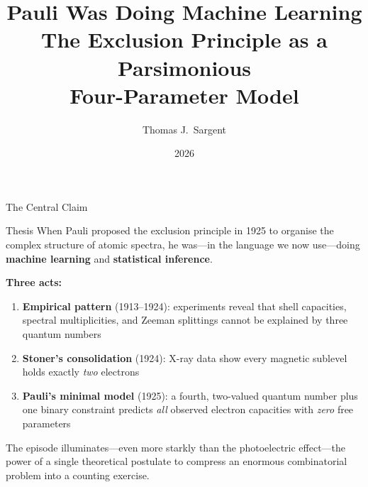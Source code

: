 \documentclass[aspectratio=169,12pt]{beamer}
\title[Pauli Was Doing Machine Learning]{%
  \textbf{Pauli Was Doing Machine Learning}\\[4pt]
  {\normalsize The Exclusion Principle as a Parsimonious\\
   Four-Parameter Model}}
\author{Thomas J.\ Sargent}
\institute{New York University \& Hoover Institution}
\date{2026}
\begin{document}

\begin{frame}[plain]
  \titlepage
\end{frame}

\begin{frame}{The Central Claim}

\begin{block}{Thesis}
When Pauli proposed the exclusion principle in 1925 to organise the
complex structure of atomic spectra, he was---in the language we now
use---doing \textbf{machine learning} and \textbf{statistical inference}.
\end{block}

\bigskip
\textbf{Three acts:}
\begin{enumerate}
  \item[\color{theoryblue}1.] \textbf{Empirical pattern} (1913--1924):
    experiments reveal that shell capacities, spectral multiplicities, and
    Zeeman splittings cannot be explained by three quantum numbers
  \item[\color{datared}2.] \textbf{Stoner's consolidation} (1924):
    X-ray data show every magnetic sublevel holds exactly \emph{two} electrons
  \item[\color{mlgreen}3.] \textbf{Pauli's minimal model} (1925):
    a fourth, two-valued quantum number plus one binary constraint predicts
    \emph{all} observed electron capacities with \emph{zero} free parameters
\end{enumerate}

\bigskip
\small The episode illuminates---even more starkly than the photoelectric
effect---the power of a single theoretical postulate to compress an
enormous combinatorial problem into a counting exercise.

\end{frame}
\end{document}
